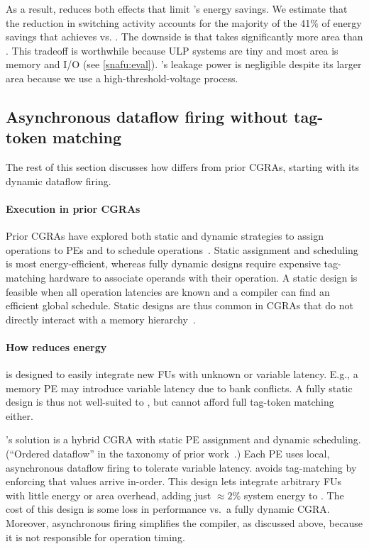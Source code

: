 As a result, \snafuframe reduces both effects that limit \manic's energy savings.
%
We estimate that the reduction in switching activity accounts for the majority of the 41$\%$ of energy savings that \snafuframe achieves vs. \manic. 
%
The downside is that \snafu takes significantly more area
than \manic.
This tradeoff is worthwhile because ULP systems are tiny and most area is memory and I/O
(see \autoref{snafu:eval}).
%
\snafu's leakage power is negligible despite its larger area because we use a high-threshold-voltage process.

\subsection{Asynchronous dataflow firing without tag-token matching}

The rest of this section discusses how \snafuframe differs from prior CGRAs,
starting with its dynamic dataflow firing.

\paragraph{Execution in prior CGRAs}
%
Prior CGRAs have explored both static and dynamic strategies
to assign operations to PEs
and to schedule operations~\cite{weng2020hybrid}.
%
Static assignment and scheduling is most energy-efficient,
whereas fully dynamic designs require expensive tag-matching hardware to associate operands with their operation.
%
A static design is feasible when all operation latencies are known and a
compiler can find an efficient global schedule.
%
Static designs are thus common in CGRAs that do not directly interact with a memory hierarchy~\cite{dyser,karunaratne2017hycube,nowatzki:isca17:stream-dataflow}.

\paragraph{How \snafu reduces energy}
%
\snafuframe is designed to easily integrate new FUs with unknown or variable
latency.
%
E.g., a memory PE may introduce variable latency due to bank conflicts.
%
A fully static design is thus not well-suited to \snafuframe, but \snafuframe cannot afford full tag-token matching either.

\snafuframe's solution is a hybrid CGRA with static PE assignment and dynamic scheduling.
%
(``Ordered dataflow'' in the taxonomy of prior work~\cite{weng2020hybrid}.)
%
Each PE uses local, asynchronous dataflow firing to tolerate variable latency.
%
\snafuframe avoids tag-matching by enforcing that values arrive in-order.
%
This design lets \snafuframe integrate arbitrary FUs with little energy or area overhead,
adding just $\approx2\%$ system energy to \snafuarch. 
%
The cost of this design is some loss in performance vs.\ a fully dynamic CGRA.
%
Moreover, asynchronous firing simplifies the compiler, as discussed
above, because it is not responsible for operation timing.

